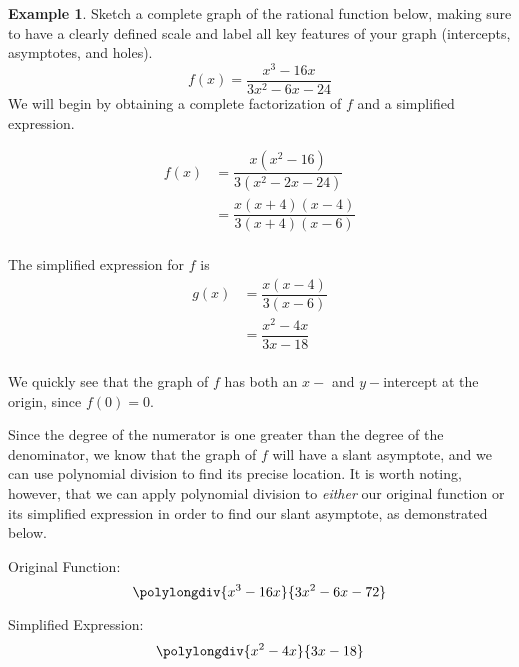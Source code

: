 \documentclass[12pt]{book}
\theoremstyle{definition}
\newtheorem{example}{Example}
\begin{document}
\begin{example}\label{rat_ineq_1}Sketch a complete graph of the rational function below, making sure to have a clearly defined scale and label all key features of your graph (intercepts, asymptotes, and holes).
$$f(x)=\dfrac{x^3-16x}{3x^2-6x-24}$$
We will begin by obtaining a complete factorization of $f$ and a simplified expression.
\begin{multicols}{2}
\begin{equation*}
\begin{split}
f(x) & = %
		\dfrac{x(x^2-16)}{3(x^2-2x-24)}\\
		 & = \dfrac{x(x+4)(x-4)}{3(x+4)(x-6)}\\
\end{split}
\end{equation*}

\columnbreak

The simplified expression for $f$ is 
\begin{equation*}
\begin{split}
g(x) & =\dfrac{x(x-4)}{3(x-6)}\\
& = \dfrac{x^2-4x}{3x-18}\\
\end{split}
\end{equation*}
\end{multicols}
We quickly see that the graph of $f$ has both an $x-$ and $y-$intercept at the origin, since $f(0)=0$.
\par
Since the degree of the numerator is one greater than the degree of the denominator, we know that the graph of $f$ will have a slant asymptote, and we can use polynomial division to find its precise location.  It is worth noting, however, that we can apply polynomial division to {\it either} our original function or its simplified expression in order to find our slant asymptote, as demonstrated below. 
\begin{multicols}{2}
Original Function:
\[
\polylongdiv{x^3-16x}{3x^2-6x-72}
\]

\columnbreak 

Simplified Expression:
\[
\polylongdiv{x^2-4x}{3x-18}
\]
\end{multicols}


\end{example}
\end{document}
